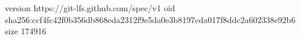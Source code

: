 version https://git-lfs.github.com/spec/v1
oid sha256:ccf4fc42f0b356db868eda2312f9e5da0e3b8197cda017f8ddc2a602338e92b6
size 174916
